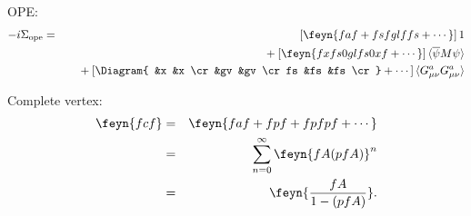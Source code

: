 \documentclass[10pt]{article}
\makeatletter
\def\refptcirc{\lower\feyn@maxis \hbox to 0pt{\hss$\circ$\hss}}
\let\\\cr
\makeatother
\begin{document}
OPE:
\def\bracket#1{\langle #1 \rangle}
\begin{eqnarray*}
-i\Sigma_{\mathrm{ope}} &=&
     \left[\feyn{faf + fsfglffs 
                 + \cdots} \right] 1 \\
     && \quad{}+ 
           \left[ \feyn{ fxfs0glfs0xf 
                  + \cdots} \right]
         \bracket{\overline\psi M \psi} \\
     && \quad{}+ \left[
         \Diagram{   &x  &x  \\
                     &gv &gv \\
                  fs &fs &fs \\} + \cdots
         \right]
         \bracket{G_{\mu\nu}^a G_{\mu\nu}^a}\\
\end{eqnarray*}

Complete vertex:
\begin{eqnarray*}
\feyn{fcf} &=& \feyn{faf + fpf + fpfpf + \cdots} \\
    &=& \sum_{n=0}^\infty \feyn{fA ( pfA)}^n \\
    &=& \feyn{\frac{fA}{1-(pfA)}}.
\end{eqnarray*}



\iffalse
\halign{&#\hfil\quad&$\refptcirc\feyn{#}$ \cr
a & a \\
c & c \\
f & f \\
F & F \\
fs & fs \\
fl & fl \\
fu & fu \\
fd & fd \\
fv & fv \\
f0 & f0 \\
fs0 & fs0 \\
g & g \\
G & G \\
gl & gl \\
glu & glu \\
$\backslash$ smallbosonloop & \smallbosonloop \\
$\backslash$ bigbosonloop & \bigbosonloop \\
gu & gu \\
gd & gd \\
gv & gv \\
gvs & gvs \\
gvb & gvb \\
h & h \\
hs & hs \\
hu & hu \\
hd & hd \\
k & k \\
l & l \\
m & m \\
ms & ms \\
n & n \\
o & o \\
p & p \\
x & x \\
w & w \\
}
\fi
\end{document}
